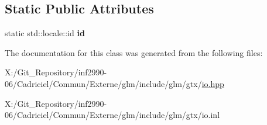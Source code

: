 \subsection*{Static Public Attributes}
\begin{DoxyCompactItemize}
\item 
\hypertarget{classglm_1_1io_1_1format__punct_a763f60aeaecec9290917ed1d83b79838}{static std\-::locale\-::id {\bfseries id}}\label{classglm_1_1io_1_1format__punct_a763f60aeaecec9290917ed1d83b79838}

\end{DoxyCompactItemize}


The documentation for this class was generated from the following files\-:\begin{DoxyCompactItemize}
\item 
X\-:/\-Git\-\_\-\-Repository/inf2990-\/06/\-Cadriciel/\-Commun/\-Externe/glm/include/glm/gtx/\hyperlink{io_8hpp}{io.\-hpp}\item 
X\-:/\-Git\-\_\-\-Repository/inf2990-\/06/\-Cadriciel/\-Commun/\-Externe/glm/include/glm/gtx/io.\-inl\end{DoxyCompactItemize}
